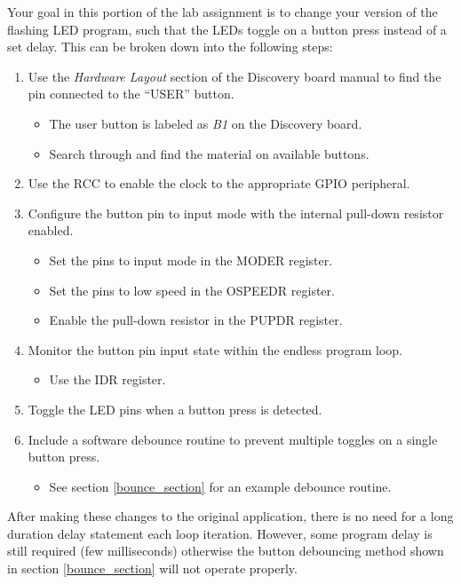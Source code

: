 \documentclass[11pt,fleqn]{book} %
\begin{document}
Your goal in this portion of the lab assignment is to change your version of the flashing LED program, such that the LEDs toggle on a button press instead of a set delay. This can be broken down into the following steps:

\begin{enumerate}
    \item Use the \textit{Hardware Layout} section of the Discovery board manual to find the pin connected to the ``USER'' button.
    \begin{itemize}
        \item The user button is labeled as \textit{B1} on the Discovery board.
        \item Search through and find the material on available buttons. 
    \end{itemize}
    \item Use the RCC to enable the clock to the appropriate GPIO peripheral.
    \item Configure the button pin to input mode with the internal pull-down resistor enabled.
    \begin{itemize}
        \item Set the pins to input mode in the MODER register. 
        \item Set the pins to low speed in the OSPEEDR register. 
        \item Enable the pull-down resistor in the PUPDR register. 
    \end{itemize}
    \item Monitor the button pin input state within the endless program loop.
    \begin{itemize}
        \item Use the IDR register.  
    \end{itemize}
    \item Toggle the LED pins when a button press is detected.
    \item Include a software debounce routine to prevent multiple toggles on a single button press.
    \begin{itemize}
        \item See section \ref{bounce_section} for an example debounce routine. 
    \end{itemize}
\end{enumerate}

After making these changes to the original application, there is no need for a long duration delay statement each loop iteration. However, some program delay is still required (few milliseconds) otherwise the button debouncing method shown in section \ref{bounce_section} will not operate properly. 
\end{document}
